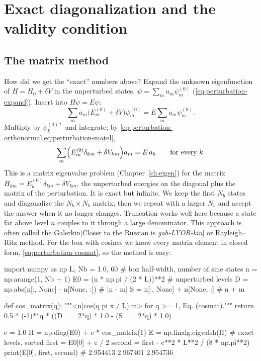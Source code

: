 \section{Exact diagonalization and the validity condition}\label{sec:perturbation-validity}

\subsection{The matrix method}

How did we get the ``exact'' numbers above? Expand the unknown eigenfunction of $H=H_0+\delta V$ in the unperturbed states, $\psi=\sum_ma_m\psi_m^{(0)}$ (\cref{eq:perturbation-expand}). Insert into $H\psi=E\psi$:
\[
\sum_ma_m\bigl(E_m^{(0)}+\delta V\bigr)\psi_m^{(0)}=E\sum_ma_m\psi_m^{(0)} .
\]
Multiply by $\psi_k^{(0)*}$ and integrate; by \cref{eq:perturbation-orthonormal,eq:perturbation-matel},
\begin{equation}
\sum_m\Bigl(E_m^{(0)}\delta_{km}+\delta V_{km}\Bigr)a_m=E\,a_k\qquad\text{for every }k.
\label{eq:perturbation-galerkin}
\end{equation}
This is a matrix eigenvalue problem (Chapter~\ref{ch:eigen}) for the matrix $H_{km}=E_k^{(0)}\delta_{km}+\delta V_{km}$, the unperturbed energies on the diagonal plus the matrix of the perturbation. It is exact but infinite. We keep the first $N_b$ states and diagonalize the $N_b\times N_b$ matrix; then we repeat with a larger $N_b$ and accept the answer when it no longer changes. Truncation works well here because a state far above level $n$ couples to it through a large denominator. This approach is often called the Galerkin[Closer to the Russian is \emph{gah-LYOR-kin}] or Rayleigh--Ritz method. For the box with cosines we know every matrix element in closed form, \cref{eq:perturbation-cosmat}, so the method is easy:

\begin{pycode}
import numpy as np
L, Nb = 1.0, 60                     # box half-width, number of sine states
n = np.arange(1, Nb + 1)
E0 = (n * np.pi / (2 * L))**2       # unperturbed levels
D = np.abs(n[:, None] - n[None, :]) # |n - m|
S = n[:, None] + n[None, :]         # n + m

def cos_matrix(q):
    """<n|cos(q pi x / L)|m> for q >= 1, Eq. (cosmat)."""
    return 0.5 * (-1)**q * ((D == 2*q) * 1.0 - (S == 2*q) * 1.0)

c = 1.0
H = np.diag(E0) + c * cos_matrix(1)
E = np.linalg.eigvalsh(H)           # exact levels, sorted
first  = E0[0] + c / 2
second = first - c**2 * L**2 / (8 * np.pi**2)
print(E[0], first, second)          # 2.954413  2.967401  2.954736
\end{pycode}


